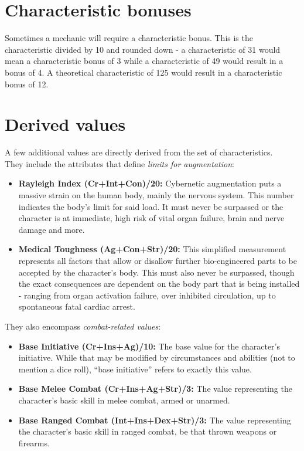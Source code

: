 \documentclass[12pt,a4paper,openany,usenames,dvipsnames]{book}
\begin{document}
	\begin{minipage}{\columnwidth}
	\section{Characteristic bonuses}
	Sometimes a mechanic will require a characteristic bonus. This is the characteristic divided by 10 and rounded down - a characteristic of 31 would mean a characteristic bonus of 3 while a characteristic of 49 would result in a bonus of 4. A theoretical characteristic of 125 would result in a characteristic bonus of 12.
	\end{minipage}
	
	\section{Derived values}
	A few additional values are directly derived from the set of characteristics. \\
	They include the attributes that define \emph{limits for augmentation}:
	\begin{itemize}
		\setlength\itemsep{-8mm}
		\item \textbf{Rayleigh Index \textlangle(Cr+Int+Con)/20\textrangle:}
		Cybernetic augmentation puts a massive strain on the human body, mainly the nervous system.
		This number indicates the body’s limit for said load.
		It must never be surpassed or the character is at immediate, high risk of vital organ failure, brain and nerve damage and more.
		\item \textbf{Medical Toughness \textlangle(Ag+Con+Str)/20\textrangle:}
		This simplified measurement represents all factors that allow or disallow further bio-engineered parts to be accepted by the character’s body.
		This must also never be surpassed, though the exact consequences are dependent on the body part that is being installed 
		- ranging from organ activation failure, over inhibited circulation, up to spontaneous fatal cardiac arrest.
	\end{itemize}

	They also encompass \emph{combat-related values}:
	\begin{itemize}
		\setlength\itemsep{-8mm}
		\item \textbf{Base Initiative \textlangle(Cr+Ins+Ag)/10\textrangle:} The base value for the character’s initiative. While that may be modified by circumstances and abilities (not to mention a dice roll), “base initiative” refers to exactly this value.
		\item \textbf{Base Melee Combat \textlangle(Cr+Ins+Ag+Str)/3\textrangle:} The value representing the character’s basic skill in melee combat, armed or unarmed.
		\item \textbf{Base Ranged Combat \textlangle(Int+Ins+Dex+Str)/3\textrangle:} The value representing the character’s basic skill in ranged combat, be that thrown weapons or firearms.
	\end{itemize}
\end{document}
